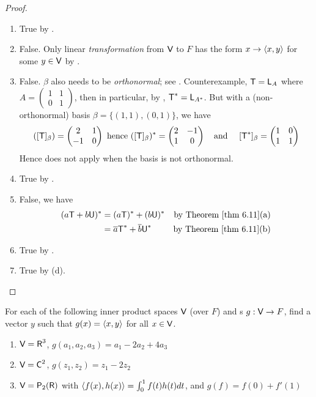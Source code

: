 \begin{proof} \ 

\begin{enumerate}
\item True by .
\item False. Only linear \emph{transformation} from \(\textsf{V}\) to \(F\) has the form \(x \to \left< x, y \right>\) for some \(y \in \textsf{V}\) by .
\item False. \(\beta\) also needs to be \emph{orthonormal}; see .
Counterexample, \(\textsf{T} = \textsf{L}_A\) where \(A = \begin{pmatrix} 1 & 1 \\ 0 & 1 \end{pmatrix}\), then in particular, by , \(\textsf{T}^* = \textsf{L}_{A^*}\).
But with a (non-orthonormal) basis \(\beta = \{(1, 1), (0, 1)\}\), we have
\[
    ([\textsf{T}]_{\beta}) = \begin{pmatrix} 2 & 1 \\ -1 & 0 \end{pmatrix} \text{ hence } ([\textsf{T}]_{\beta})^* = \begin{pmatrix} 2 & -1 \\ 1 & 0 \end{pmatrix} \text{\quad and \quad} [\textsf{T}^*]_{\beta} = \begin{pmatrix} 1 & 0 \\ 1 & 1 \end{pmatrix}
\]
Hence  does not apply when the basis is not orthonormal.

\item True by .
\item False,
we have
\begin{align*}
    (a\T + b\U)^* & = (a\T)^* + (b\U)^* & \text{by \THM{6.11}(a)} \\
        & = \conjugatet{a}\T^* + \conjugatet{b}\U^* & \text{by \THM{6.11}(b)}
\end{align*}
\item True by .
\item True by (d).
\end{enumerate}
\end{proof}

\begin{exercise} \label{exercise 6.3.2}
For each of the following inner product spaces \(\textsf{V}\) (over \(F\)) and \LTRAN{}s \(g : \textsf{V} \to F\), find a vector \(y\) such that \(g(x) = \left< x, y \right>\) for all \(x \in \textsf{V}\).
\begin{enumerate}
\item \(\textsf{V} = \textsf{R}^3\), \(g(a_1, a_2, a_3) = a_1 - 2a_2 + 4a_3\)
\item \(\textsf{V} = \textsf{C}^2\), \(g(z_1, z_2) = z_1 - 2z_2\)
\item \(\textsf{V} = \textsf{P}_2(\textsf{R})\) with \(\left< f(x), h(x) \right> = \int_0^1 f(t)h(t) dt\), and \(g(f) = f(0) + f'(1)\)
\end{enumerate}
\end{exercise}

